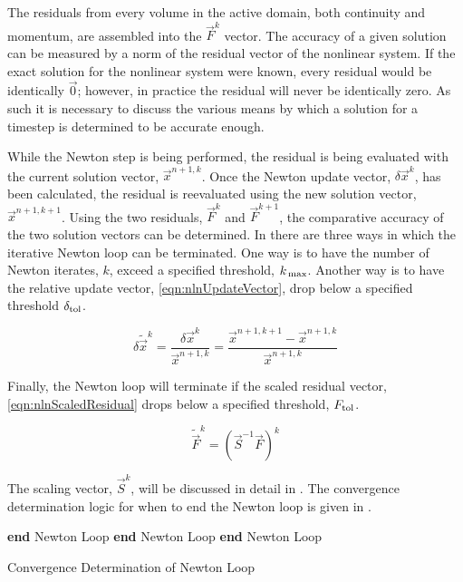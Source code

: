 The residuals from every volume in the active domain, both continuity and momentum, are assembled into the $\vec{F}^{k}$ vector.
The accuracy of a given solution can be measured by a norm of the residual vector of the nonlinear system.
If the exact solution for the nonlinear system were known, every residual would be identically $\vec{0}$; however, in practice the residual will never be identically zero.
As such it is necessary to discuss the various means by which a solution for a timestep is determined to be accurate enough.

While the Newton step is being performed, the residual is being evaluated with the current solution vector, $\vec{x}^{n+1,k}$.
Once the Newton update vector, $\delta \vec{x}^{k}$, has been calculated, the residual is reevaluated using the new solution vector, $\vec{x}^{n+1, k+1}$.
Using the two residuals, $\vec{F}^{k}$ and $\vec{F}^{k+1}$, the comparative accuracy of the two solution vectors can be determined.
In \cobra{} there are three ways in which the iterative Newton loop can be terminated.
One way is to have the number of Newton iterates, $k$, exceed a specified threshold, $\kmax{}$.
Another way is to have the relative update vector, \eqref{eqn:nlnUpdateVector}, drop below a specified threshold $\dtol{}$.

\begin{equation}
\label{eqn:nlnUpdateVector}
\delta \tilde{\vec{x}}^{k} = \frac{\delta \vec{x}^{k}}{\vec{x}^{n+1, k}} = \frac{ \vec{x}^{n+1, k+1} - \vec{x}^{n+1, k}}{\vec{x}^{n+1,k}}
\end{equation}

Finally, the Newton loop will terminate if the scaled residual vector, \eqref{eqn:nlnScaledResidual} drops below a specified threshold, $\ftol{}$.

\begin{equation}
\label{eqn:nlnScaledResidual}
\tilde{\vec{F}}^{k} = (\vec{S}^{-1}\vec{F})^{k}
\end{equation}

The scaling vector, $\vec{S}^{k}$, will be discussed in detail in .
The convergence determination logic for when to end the Newton loop is given in .

\begin{algo}[h!]
\setlength{\baselineskip}{0.625\baselineskip}
\begin{algorithmic}[1]
	\State \textbf{end} Newton Loop
	\State \textbf{end} Newton Loop
	\State \textbf{end} Newton Loop
\EndIf
\end{algorithmic}
\caption{Convergence Determination of Newton Loop}
\label{alg:nlnConvergence}
\end{algo}

